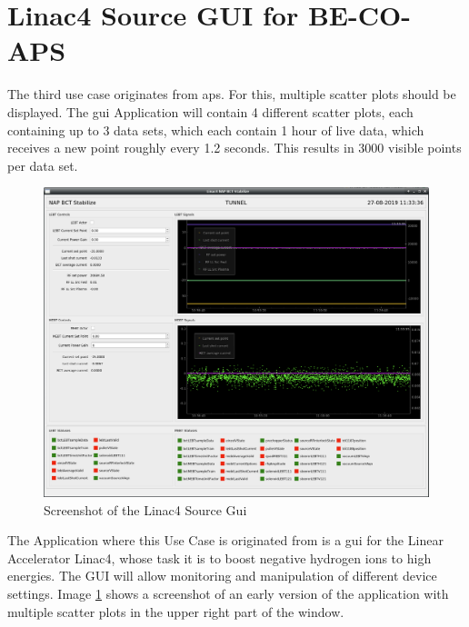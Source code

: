 \section{Linac4 Source GUI for BE-CO-APS}
\label{sec:usecases:linac}

The third use case originates from \gls{aps}. For this, multiple scatter plots
should be displayed. The \gls{gui} Application will contain 4 different scatter
plots, each containing up to 3 data sets, which each contain 1 hour of live
data, which receives a new point roughly every 1.2 seconds. This results in 3000
visible points per data set.

\begin{figure}[h]
    \centering
    \includegraphics[width=15cm]{resources/img/Linac4SourceGui}
    \caption{Screenshot of the Linac4 Source Gui}
    \label{fig:linac4sourcegui}
\end{figure}

The Application where this Use Case is originated from is a \gls{gui} for the
Linear Accelerator Linac4, whose task it is to boost negative hydrogen ions to
high energies. The GUI will allow monitoring and manipulation of different
device settings. Image \ref{fig:linac4sourcegui} shows a screenshot of an early
version of the application with multiple scatter plots in the upper right part
of the window.
\cite{LinacFour,LinacFourGuiPres}

